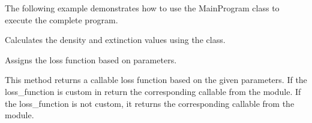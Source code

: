 \documentclass[letterpaper,10pt,english]{sphinxmanual}
\begin{document}
\begin{fulllineitems}
\begin{description}
\begin{itemize}
\begin{description}
\end{description}

\end{itemize}

\sphinxAtStartPar
The following example demonstrates how to use the MainProgram class to execute the complete program.

\begin{sphinxVerbatim}[commandchars=\\\{\}]
  
\end{sphinxVerbatim}

\end{description}

\begin{fulllineitems}
\label{\detokenize{MainProgram:MainProgram.MainProgram.calculate_density_extinction}}
\pysigstartsignatures
{}
\pysigstopsignatures
\sphinxAtStartPar
Calculates the density and extinction values using the  class.

\end{fulllineitems}


\begin{fulllineitems}
\label{\detokenize{MainProgram:MainProgram.MainProgram.check_and_assign_loss_function}}
\pysigstartsignatures
{}
\pysigstopsignatures
\sphinxAtStartPar
Assigns the loss function based on parameters.
\begin{description}
\sphinxAtStartPar
This method returns a callable loss function based on the given parameters.
If the loss\_function is custom in return the corresponding callable from the  module.
If the loss\_function is not custom, it returns the corresponding callable from the 
module.


\end{description}
\end{fulllineitems}
\end{fulllineitems}
\end{document}
